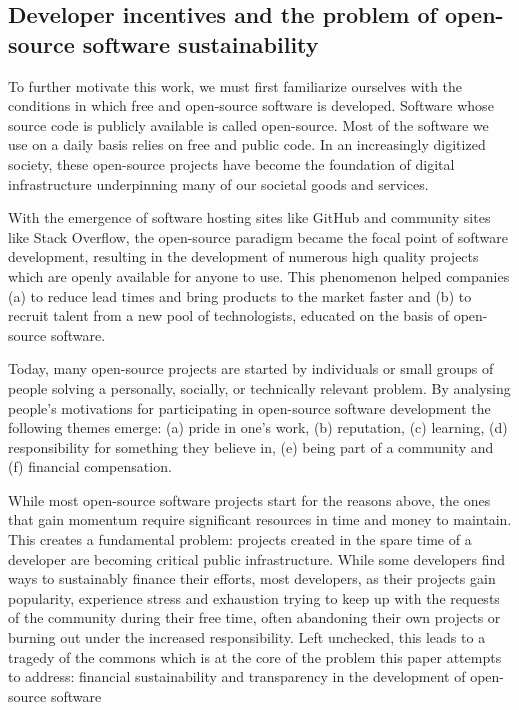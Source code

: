 \subsection{Developer incentives and the problem of open-source software
sustainability}

To further motivate this work, we must first familiarize ourselves with the
conditions in which free and open-source software is developed. Software whose
source code is publicly available is called open-source. Most of the software
we use on a daily basis relies on free and public code. In an increasingly
digitized society, these open-source projects have become the foundation of
digital infrastructure underpinning many of our societal goods and services.

With the emergence of software hosting sites like GitHub and community sites
like Stack Overflow, the open-source paradigm became the focal point of
software development, resulting in the development of numerous high quality
projects which are openly available for anyone to use. This phenomenon helped
companies (a) to reduce lead times and bring products to the market faster and
(b) to recruit talent from a new pool of technologists, educated on the basis
of open-source software.

Today, many open-source projects are started by individuals or small groups of
people solving a personally, socially, or technically relevant problem. By
analysing people's motivations for participating in open-source software
development the following themes emerge: (a) pride in one's work, (b)
reputation, (c) learning, (d) responsibility for something they believe in, (e)
being part of a community and (f) financial compensation.

While most open-source software projects start for the reasons above, the ones
that gain momentum require significant resources in time and money to maintain.
This creates a fundamental problem: projects created in the spare time of a
developer are becoming critical public infrastructure. While some developers
find ways to sustainably finance their efforts, most developers, as their
projects gain popularity, experience stress and exhaustion trying to keep up
with the requests of the community during their free time, often abandoning
their own projects or burning out under the increased responsibility. Left
unchecked, this leads to a tragedy of the commons which is at the core of the
problem this paper attempts to address: financial sustainability and
transparency in the development of open-source software

